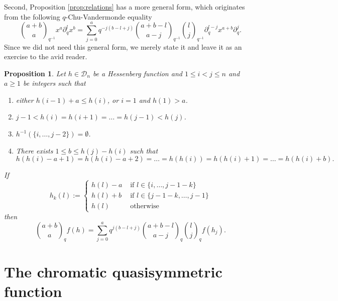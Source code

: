\documentclass[10pt]{amsart}
\newtheorem{Prop}[Lem]{Proposition}
\theoremstyle{definition}
\newcommand{\D}{\mathcal{D}}
\begin{document}
Second, Proposition \ref{prop:relations} has a more general form, which originates from the following $q$-Chu-Vandermonde equality
\[
{{a+b}\choose a}_{q^{-1}}x^a\partial_q^lx^b=\sum_{j=0}^a q^{-j(b-l+j)}{{a+b-l} \choose {a-j}}_{q^{-1}}{l\choose j}_{q^{-1}}\partial_q^{l-j}x^{a+b}\partial_q^{j}.
\]
Since we did not need this general form, we merely state it and leave it as an exercise to the avid reader.
\begin{Prop}
Let $h\in \D_n$ be a Hessenberg function and $1\leq i<j\leq n$ and $a\geq 1$ be integers such that
\begin{enumerate}
    \item either $h(i-1)+a\leq h(i)$, or $i=1$ and $h(1)>a$.
    \item $j-1<h(i)=h(i+1)=\ldots=h(j-1)<h(j)$.
    \item $h^{-1}(\{i,\ldots, j-2\})=\emptyset$.
    \item There exists $1\leq b\leq h(j)-h(i)$ such that
    \[
    h(h(i)-a+1)=h(h(i)-a+2)=\ldots=h(h(i))=h(h(i)+1)=\ldots=h(h(i)+b).
    \]
\end{enumerate}
If
\[
h_k(l):=\begin{cases}
h(l)-a &\text{ if }l\in \{i,\ldots, j-1-k\}\\
h(l)+b & \text{ if }l\in\{j-1-k,\ldots, j-1\}\\
h(l)&\text{ otherwise}
\end{cases}
\]
then
\begin{equation}
\label{eq:cv}
{a+b\choose a}_qf(h)=\sum_{j=0}^a q^{j(b-l+j)}{a+b-l\choose a- j}_q{l\choose j}_q f(h_j).
\end{equation}
\end{Prop}




\section{The chromatic quasisymmetric function}
\end{document}
